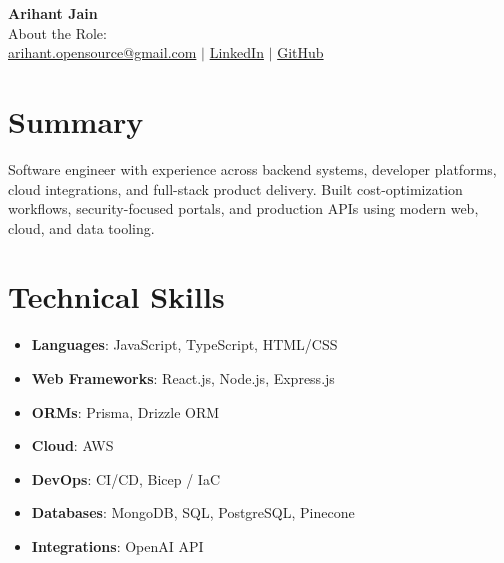 \documentclass[11pt,a4paper]{article}
\begin{document}
\begin{center}
{\LARGE \textbf{Arihant Jain}}
\\ About the Role:
\\ \href{mailto:arihant.opensource@gmail.com}{arihant.opensource@gmail.com} $\mid$ \href{https://linkedin.com/in/arihantjain1208}{LinkedIn} $\mid$ \href{https://github.com/Arihant1208}{GitHub}
\end{center}

\section{Summary}
Software engineer with experience across backend systems, developer platforms, cloud integrations, and full-stack product delivery. Built cost-optimization workflows, security-focused portals, and production APIs using modern web, cloud, and data tooling.

\section{Technical Skills}
\begin{itemize}
  \item \textbf{Languages}: JavaScript, TypeScript, HTML/CSS
  \item \textbf{Web Frameworks}: React.js, Node.js, Express.js
  \item \textbf{ORMs}: Prisma, Drizzle ORM
  \item \textbf{Cloud}: AWS
  \item \textbf{DevOps}: CI/CD, Bicep / IaC
  \item \textbf{Databases}: MongoDB, SQL, PostgreSQL, Pinecone
  \item \textbf{Integrations}: OpenAI API
\end{itemize}
\end{document}

